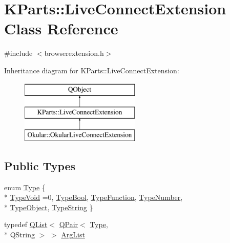 \hypertarget{classKParts_1_1LiveConnectExtension}{\section{K\+Parts\+:\+:Live\+Connect\+Extension Class Reference}
\label{classKParts_1_1LiveConnectExtension}
}


{\ttfamily \#include $<$browserextension.\+h$>$}

Inheritance diagram for K\+Parts\+:\+:Live\+Connect\+Extension\+:\begin{figure}[H]
\begin{center}
\leavevmode
\includegraphics[height=3.000000cm]{classKParts_1_1LiveConnectExtension}
\end{center}
\end{figure}
\subsection*{Public Types}
\begin{DoxyCompactItemize}
\item 
enum \hyperlink{classKParts_1_1LiveConnectExtension_a8dfff0d5feb20316c714179c9eda9a9c}{Type} \{ \\*
\hyperlink{classKParts_1_1LiveConnectExtension_a8dfff0d5feb20316c714179c9eda9a9ca862f2f5258607f30adbbe03395426c20}{Type\+Void} =0, 
\hyperlink{classKParts_1_1LiveConnectExtension_a8dfff0d5feb20316c714179c9eda9a9ca3fed8b3ab2f5490fd7e6c6fca8b4a14b}{Type\+Bool}, 
\hyperlink{classKParts_1_1LiveConnectExtension_a8dfff0d5feb20316c714179c9eda9a9ca9f107d1ffb0bab7084c2952c00cf7f79}{Type\+Function}, 
\hyperlink{classKParts_1_1LiveConnectExtension_a8dfff0d5feb20316c714179c9eda9a9cadd765f23d443e96389613f184e874987}{Type\+Number}, 
\\*
\hyperlink{classKParts_1_1LiveConnectExtension_a8dfff0d5feb20316c714179c9eda9a9cadc439c83b2bb144692429d76408cb5b7}{Type\+Object}, 
\hyperlink{classKParts_1_1LiveConnectExtension_a8dfff0d5feb20316c714179c9eda9a9ca2f39f6b5f442bd7909c8810770d3ca95}{Type\+String}
 \}
\item 
typedef \hyperlink{classQList}{Q\+List}$<$ \hyperlink{structQPair}{Q\+Pair}$<$ \hyperlink{classKParts_1_1LiveConnectExtension_a8dfff0d5feb20316c714179c9eda9a9c}{Type}, \\*
Q\+String $>$ $>$ \hyperlink{classKParts_1_1LiveConnectExtension_a16a7a582605755e47eaab5b37e73d8cb}{Arg\+List}
\end{DoxyCompactItemize}
